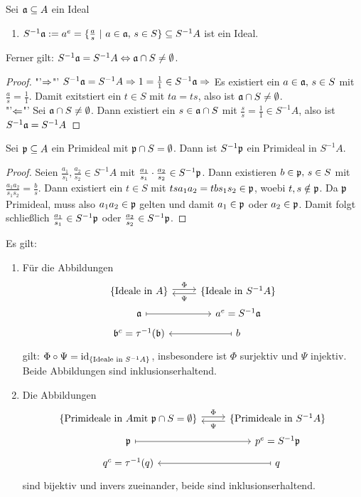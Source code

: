 \begin{bem+df}\label{12.1}
	Sei $\mathfrak{a}\subseteq A$ ein Ideal
	\begin{enumerate}
		\item[] $S^{-1}\a := a^e=\{\frac{a}{s}\ | \ a\in \a, \, s\in S\}\subseteq S^{-1}A$ ist ein Ideal.
	\end{enumerate}
	Ferner gilt: $S^{-1}\mathfrak{a}= S^{-1}A\Leftrightarrow \mathfrak{a}\cap S \neq \emptyset$. 
\end{bem+df}
\begin{proof}
	"'$\Rightarrow$"' $S^{-1}\mathfrak{a} = S^{-1}A \Rightarrow 1 = \frac{1}{1} \in S^{-1}\mathfrak{a} \Rightarrow $ Es existiert ein $a\in \mathfrak{a}, \, s\in S$ mit $\frac{a}{s} = \frac{1}{1}$. Damit exitstiert ein $t\in S$ mit $ta = ts$, also ist $\mathfrak{a} \cap S \neq \emptyset$.\\
	"'$\Leftarrow$"' Sei $\mathfrak{a}\cap S\neq \emptyset$. Dann existiert ein $s\in \mathfrak{a} \cap S$ mit $\frac{s}{s} = \frac{1}{1}\in S^{-1}A$, also ist $S^{-1}\mathfrak{a} = S^{-1}A$
\end{proof}
\begin{bem}\label{12.2}
	Sei $\mathfrak{p} \subseteq A$ ein Primideal mit $\mathfrak{p}\cap S=\emptyset$. Dann ist $S^{-1}\mathfrak{p}$ ein Primideal in $S^{-1} A$.
\end{bem}
\begin{proof}
	Seien $\frac{a_1}{s_1}, \frac{a_2}{s_2}\in S^{-1} A$ mit $\frac{a_1}{s_1} \cdot\frac{a_2}{s_2}\in S^{-1} \mathfrak{p}$. Dann existieren $b\in \mathfrak{p}, \, s\in S$ mit $\frac{a_1a_2}{s_1s_2} = \frac{b}{s}$. Dann existiert ein $t\in S$ mit $tsa_1a_2 = tbs_1s_2 \in \mathfrak{p}$, woebi $t,s\notin \mathfrak{p}$. Da $\mathfrak{p}$ Primideal, muss also $a_1a_2\in \mathfrak{p}$ gelten und damit $a_1\in \mathfrak{p}$ oder $a_2\in \mathfrak{p}$. Damit folgt schließlich $\frac{a_1}{s_1}\in S^{-1} \mathfrak{p}$ oder $\frac{a_2}{s_2}\in S^{-1}\mathfrak{p}$.
\end{proof}
\begin{bem}\label{12.3}
	Es gilt:
	\begin{enumerate}[label=\alph*)]
		\item Für die Abbildungen
		$$\begin{tikzcd}[row sep = tiny]
		\{\text{Ideale in } A\} \arrow[yshift = 0.5ex]{r}{\Phi} & \{\text{Ideale in } S^{-1}A\} \arrow[yshift = -0.5ex]{l}{\Psi} \\
		\a \arrow[mapsto]{r}& a^e=S^{-1} \a \\
		\b^c=\tau^{-1}(\b) & b\arrow[mapsto]{l}
		\end{tikzcd}$$
		gilt: $\Phi \circ \Psi = \operatorname{id}_{\{\text{Ideale in } S^{-1}A\}}$, insbesondere ist $\Phi$ surjektiv und $\Psi $ injektiv. Beide Abbildungen sind inklusionserhaltend.
		\item Die Abbildungen
		$$\begin{tikzcd}[row sep = tiny]
		\{\text{Primideale in } A \text{mit } \p\cap S = \emptyset\} \arrow[yshift = 0.5ex]{r}{\Phi} & \{\text{Primideale in } S^{-1}A\} \arrow[yshift = -0.5ex]{l}{\Psi} \\
		\p \arrow[mapsto]{r}& p^e=S^{-1} \p \\
		q^c=\tau^{-1}(q) & q\arrow[mapsto]{l}
		\end{tikzcd}$$
		sind bijektiv und invers zueinander, beide sind inklusionserhaltend.
	\end{enumerate}
\end{bem}
